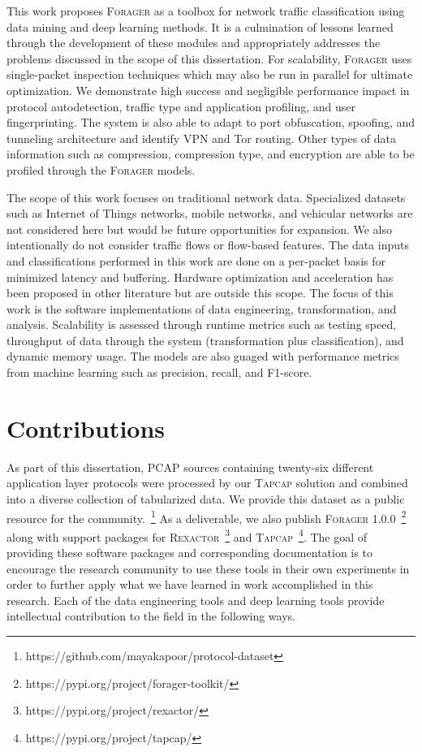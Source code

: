 This work proposes \textsc{Forager} as a toolbox for network traffic classification using data mining and deep learning methods. It is a culmination of lessons learned through the development of these modules and appropriately addresses the problems discussed in the scope of this dissertation. For scalability, \textsc{Forager} uses single-packet inspection techniques which may also be run in parallel for ultimate optimization. We demonstrate high success and negligible performance impact in protocol autodetection, traffic type and application profiling, and user fingerprinting. The system is also able to adapt to port obfuscation, spoofing, and tunneling architecture and identify VPN and Tor routing. Other types of data information such as compression, compression type, and encryption are able to be profiled through the \textsc{Forager} models.

The scope of this work focuses on traditional network data. Specialized datasets such as Internet of Things networks, mobile networks, and vehicular networks are not considered here but would be future opportunities for expansion. We also intentionally do not consider traffic flows or flow-based features. The data inputs and classifications performed in this work are done on a per-packet basis for minimized latency and buffering. Hardware optimization and acceleration has been proposed in other literature but are outside this scope. The focus of this work is the software implementations of data engineering, transformation, and analysis. Scalability is assessed through runtime metrics such as testing speed, throughput of data through the system (transformation plus classification), and dynamic memory usage. The models are also guaged with performance metrics from machine learning such as precision, recall, and F1-score.

\section{Contributions}

As part of this dissertation, PCAP sources containing twenty-six different application layer protocols were processed by our \textsc{Tapcap} solution and combined into a diverse collection of tabularized data. We provide this dataset as a public resource for the community.~\footnote{https://github.com/mayakapoor/protocol-dataset} As a deliverable, we also publish \textsc{Forager 1.0.0}~\footnote{https://pypi.org/project/forager-toolkit/} along with support packages for \textsc{Rexactor}~\footnote{https://pypi.org/project/rexactor/} and \textsc{Tapcap}~\footnote{https://pypi.org/project/tapcap/}. The goal of providing these software packages and corresponding documentation is to encourage the research community to use these tools in their own experiments in order to further apply what we have learned in work accomplished in this research. Each of the data engineering tools and deep learning tools provide intellectual contribution to the field in the following ways.

